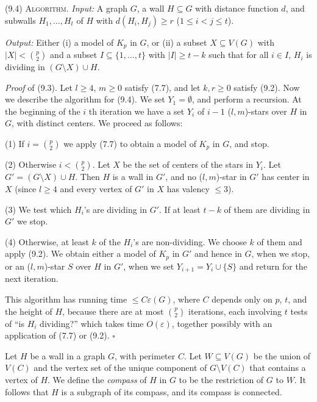 \stmt
(9.4) \textsc{Algorithm}. \textit{Input:} A graph $G$, a wall $H \subseteq G$ with distance function $d$, and subwalls $H_1, \dots, H_t$ of $H$ with $d(H_i, H_j) \ge r$ ($1 \le i < j \le t$).

\textit{Output:} Either (i) a model of $K_p$ in $G$, or (ii) a subset $X \subseteq V(G)$ with $|X| < \binom{p}{2}$ and a subset $I \subseteq \{1, \dots, t\}$ with $|I| \ge t - k$ such that for all $i \in I$, $H_i$ is dividing in $(G \setminus X) \cup H$.

\textit{Proof} of (9.3). Let $l \ge 4$, $m \ge 0$ satisfy (7.7), and let $k, r \ge 0$ satisfy (9.2). Now we describe the algorithm for (9.4). We set $Y_1 = \emptyset$, and perform a recursion. At the beginning of the $i$ th iteration we have a set $Y_i$ of $i - 1$ ($l, m$)-stars over $H$ in $G$, with distinct centers. We proceed as follows:

\hspace*{12pt}(1) If $i = \binom{p}{2}$ we apply (7.7) to obtain a model of $K_p$ in $G$, and stop.

\hspace*{12pt}(2) Otherwise $i < \binom{p}{2}$. Let $X$ be the set of centers of the stars in $Y_i$. Let $G' = (G \setminus X) \cup H$. Then $H$ is a wall in $G'$, and no ($l, m$)-star in $G'$ has center in $X$ (since $l \ge 4$ and every vertex of $G'$ in $X$ has valency $\le 3$).

\hspace*{12pt}(3) We test which $H_i$'s are dividing in $G'$. If at least $t - k$ of them are dividing in $G'$ we stop.

\hspace*{12pt}(4) Otherwise, at least $k$ of the $H_i$'s are non-dividing. We choose $k$ of them and apply (9.2). We obtain either a model of $K_p$ in $G'$ and hence in $G$, when we stop, or an ($l, m$)-star $S$ over $H$ in $G'$, when we set $Y_{i+1} = Y_i \cup \{S\}$ and return for the next iteration.

This algorithm has running time $\le C\varepsilon(G)$, where $C$ depends only on $p$, $t$, and the height of $H$, because there are at most $\binom{p}{2}$ iterations, each involving $t$ tests of ``is $H_i$ dividing?'' which takes time $O(\varepsilon)$, together possibly with an application of (7.7) or (9.2). $\square$

Let $H$ be a wall in a graph $G$, with perimeter $C$. Let $W \subseteq V(G)$ be the union of $V(C)$ and the vertex set of the unique component of $G \setminus V(C)$ that contains a vertex of $H$. We define the \textit{compass} of $H$ in $G$ to be the restriction of $G$ to $W$. It follows that $H$ is a subgraph of its compass, and its compass is connected.

